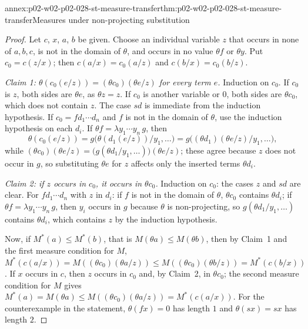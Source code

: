 \begin{annexitem}{annex:p02-w02-p02-028-st-measure-transfer}{thm:p02-w02-p02-028-st-measure-transfer}{Measures under non-projecting substitution}
\begin{proof}
Let \(c\), \(x\), \(a\), \(b\) be given.  Choose an individual variable
\(z\) that occurs in none of \(a,b,c\), is not in the domain of \(\theta\),
and occurs in no value \(\theta f\) or \(\theta y\).  Put \(c_0=c(z/x)\);
then \(c(a/x)=c_0(a/z)\) and \(c(b/x)=c_0(b/z)\).

\emph{Claim 1: \(\theta(c_0(e/z))=(\theta c_0)(\theta e/z)\) for every term
\(e\).}  Induction on \(c_0\).  If \(c_0\) is \(z\), both sides are \(\theta e\),
as \(\theta z=z\).  If \(c_0\) is another variable or \(0\), both sides are
\(\theta c_0\), which does not contain \(z\).  The case \(sd\) is immediate
from the induction hypothesis.  If \(c_0=fd_1\cdots d_n\) and \(f\) is not in
the domain of \(\theta\), use the induction hypothesis on each \(d_i\).  If
\(\theta f=\lambda y_1\cdots y_n\,g\), then
\[
 \theta(c_0(e/z))=g\bigl(\theta(d_1(e/z))/y_1,\ldots\bigr)
 =g\bigl((\theta d_1)(\theta e/z)/y_1,\ldots\bigr),
\]
while
\((\theta c_0)(\theta e/z)=\bigl(g(\theta d_1/y_1,\ldots)\bigr)(\theta e/z)\);
these agree because \(z\) does not occur in \(g\), so substituting
\(\theta e\) for \(z\) affects only the inserted terms \(\theta d_i\).

\emph{Claim 2: if \(z\) occurs in \(c_0\), it occurs in \(\theta c_0\).}
Induction on \(c_0\): the cases \(z\) and \(sd\) are clear.  For
\(fd_1\cdots d_n\) with \(z\) in \(d_i\): if \(f\) is not in the domain of
\(\theta\), \(\theta c_0\) contains \(\theta d_i\); if
\(\theta f=\lambda y_1\cdots y_n\,g\), then \(y_i\) occurs in \(g\) because
\(\theta\) is non-projecting, so \(g(\theta d_1/y_1,\ldots)\) contains
\(\theta d_i\), which contains \(z\) by the induction hypothesis.

Now, if \(M^*(a)\leq M^*(b)\), that is \(M(\theta a)\leq M(\theta b)\), then
by Claim~1 and the first measure condition for \(M\),
\(M^*(c(a/x))=M((\theta c_0)(\theta a/z))\leq M((\theta c_0)(\theta b/z))=M^*(c(b/x))\).
If \(x\) occurs in \(c\), then \(z\) occurs in \(c_0\) and, by Claim~2, in
\(\theta c_0\); the second measure condition for \(M\) gives
\(M^*(a)=M(\theta a)\leq M((\theta c_0)(\theta a/z))=M^*(c(a/x))\).  For the
counterexample in the statement, \(\theta(fx)=0\) has length \(1\) and
\(\theta(sx)=sx\) has length \(2\).
\end{proof}
\end{annexitem}

